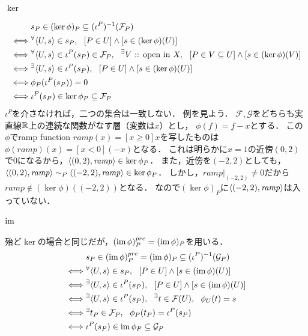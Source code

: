 \documentclass[a4paper]{jsarticle}
\newcommand{\shF}{\mathcal{F}}
\newcommand{\shG}{\mathcal{G}}
\newcommand{\OpenIn}{\text{ :: open in }}
\begin{document}
    \paragraph{$\ker$}
    \begin{align*}
        {}&     s_P \in (\ker \phi)_P \subseteq (\iota^P)^{-1}(\shF_P) \\
        \iff&   \Forall{\germ{U}{s} \in s_P} [P \in U] \land [s \in (\ker \phi)(U)] \\
        \iff&   \Forall{\germ{U}{s} \in \iota^P(s_P) \in \shF_P} \Exists{V \OpenIn X} [P \in V \subseteq U] \land [s \in (\ker \phi)(V)] \\
        \iff&   \Exists{\germ{U}{s} \in \iota^P(s_P)} [P \in U] \land [s \in (\ker \phi)(U)] \\
        \iff&   \phi_P(\iota^P(s_P))=0 \\
        \iff&   \iota^P(s_P) \in \ker \phi_P \subseteq \shF_P
    \end{align*}
    $\iota^P$を介さなければ，二つの集合は一致しない．
    例を見よう．
    $\shF, \shG$をどちらも実直線$\mathbb{R}$上の連続な関数がなす層（変数は$x$）とし，
    $\phi(f)=f-x$とする．
    この$\phi$でramp function $\mathit{ramp}(x)=[x \geq 0]x$を写したものは
    $\phi(\mathit{ramp})(x)=[x<0](-x)$となる．
    これは明らかに$x=1$の近傍$(0,2)$で0になるから，$\langle (0,2),\mathit{ramp} \rangle \in \ker \phi_P$．
    また，近傍を$(-2,2)$としても，
    $\langle (0,2),\mathit{ramp} \rangle \sim_P \langle (-2,2),\mathit{ramp} \rangle \in \ker \phi_P$．
    しかし，$\mathit{ramp}|_{(-2,2)} \neq 0$だから
    $\mathit{ramp} \not \in (\ker \phi)((-2,2))$となる．
    なので$(\ker \phi)_P$に$\langle (-2,2),\mathit{ramp} \rangle$は入っていない．

    \paragraph{$\operatorname{im}$}
    殆ど$\ker$の場合と同じだが，$(\operatorname{im} \phi)^{pre}_P=(\operatorname{im} \phi)_P$を用いる．
    \begin{align*}
        {}&     s_P \in (\im \phi)^{pre}_P=(\im \phi)_P \subseteq (\iota^P)^{-1}(\shG_P)\\
        \iff&   \Forall{\germ{U}{s} \in s_P} [P \in U] \land [s \in (\im \phi)(U)] \\
        \iff&   \Exists{\germ{U}{s} \in \iota^P(s_P)} [P \in U] \land [s \in (\im \phi)(U)] \\
        \iff&   \Exists{\germ{U}{s} \in \iota^P(s_P)} \Exists{t \in \shF(U)} \phi_U(t)=s \\
        \iff&   \Exists{t_P \in \shF_P} \phi_P(t_P)=\iota^P(s_P) \\
        \iff&   \iota^P(s_P) \in \im \phi_P \subseteq \shG_P
    \end{align*}
\end{document}
